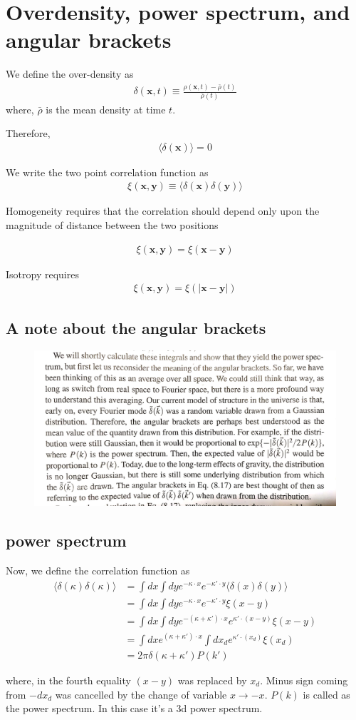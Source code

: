 \documentclass[12pt]{article}
\newcommand{\beq}{\begin{equation}}
\newcommand{\eeq}{\end{equation}}
\newcommand{\beqa}{\begin{eqnarray}}
\newcommand{\eeqa}{\end{eqnarray}}
\newcommand{\beqal}{\begin{aligned}}
\newcommand{\eeqal}{\end{aligned}}
\numberwithin{equation}{section}
\begin{document}
\section{Overdensity, power spectrum, and angular brackets}
We define the over-density as 
\beqa
\delta(\textbf{x},t) \equiv \frac{\rho (\textbf{x}, t ) - \bar{\rho}(t)}{\bar{\rho}(t)}
\eeqa
where, $ \bar{\rho} $ is the mean density at time $ t $.

Therefore, 
\beqa
\langle \delta(\textbf{x}) \rangle = 0
\eeqa

We write the two point correlation function as
\beqa
\xi(\textbf{x}, \textbf{y}) \equiv \langle \delta(\textbf{x})\delta(\textbf{y}) \rangle
\eeqa

Homogeneity requires that the correlation should depend only upon the magnitude of distance between the two positions

\beqa
\xi(\textbf{x}, \textbf{y}) =  \xi(\textbf{x} -  \textbf{y})
\eeqa

Isotropy requires
\beqa
\xi(\textbf{x}, \textbf{y}) =  \xi(|\textbf{x} -  \textbf{y}|)
\eeqa

\subsection{A note about the angular brackets}

\begin{figure}[h]
	\centering
	\includegraphics[width=0.9\linewidth]{../images/brackets}
	\caption{}
	\label{fig:brackets}
\end{figure}



\subsection{power spectrum}
Now, we define the correlation function as
\beq
\beqal
\langle \delta(\kappa) \delta(\kappa) \rangle &=  \int dx  \int dy e^{-\kappa \cdot x} e^{-\kappa' \cdot y} \langle  \delta(x) \delta(y) \rangle
\\
&= \int dx \int dy e^{-\kappa \cdot x} e^{-\kappa' \cdot y}  \xi(x - y)
\\
&= \int dx \int dy e^{-(\kappa + \kappa') \cdot x} e^{\kappa' \cdot (x-y)}  \xi(x - y)
\\
&= \int dx e^{(\kappa + \kappa') \cdot x} \int dx_d  e^{\kappa' \cdot (x_d)}  \xi(x_d)
\\
&= 2\pi \delta(\kappa + \kappa') P(k') \label{eq:correlation_function}
\eeqal
\eeq

where, in the fourth equality  $ (x-y) $ was replaced by $ x_d $. Minus sign coming from $ -dx_d $ was cancelled by the change of variable $ x \rightarrow -x $. $ P(k) $ is called as the power spectrum. In this case it's a 3d power spectrum.
\end{document}
